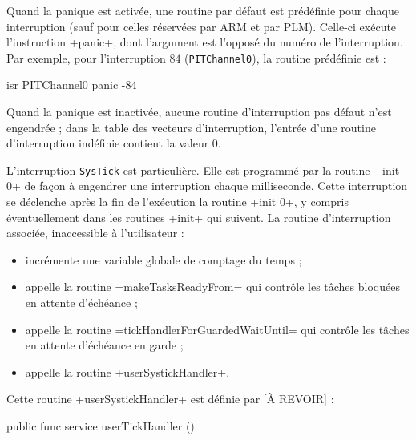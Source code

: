 Quand la panique est activée, une routine par défaut est prédéfinie pour chaque interruption (sauf pour celles réservées par ARM et par PLM). Celle-ci exécute l'instruction \plm+panic+, dont l'argument est l'opposé du numéro de l'interruption. Par exemple, pour l'interruption $84$ (\texttt{PITChannel0}), la routine prédéfinie est :

\begin{PLM}[1]
isr PITChannel0 {
  panic -84
}
\end{PLM}



Quand la panique est inactivée, aucune routine d'interruption pas défaut n'est engendrée ; dans la table des vecteurs d'interruption, l'entrée d'une routine d'interruption indéfinie contient la valeur $0$.






L'interruption \texttt{SysTick} est particulière. Elle est programmé par la routine \plm+init 0+ de façon à engendrer une interruption chaque milliseconde. Cette interruption se déclenche après la fin de l'exécution la routine \plm+init 0+, y compris éventuellement dans les routines \plm+init+ qui suivent. La routine d'interruption associée, inaccessible à l'utilisateur :
\begin{itemize}
  \item incrémente une variable globale de comptage du temps ;
  \item appelle la routine \plm=makeTasksReadyFrom= qui contrôle les tâches bloquées en attente d'échéance ; 
  \item appelle la routine \plm=tickHandlerForGuardedWaitUntil= qui contrôle les tâches en attente d'échéance en garde ; 
  \item appelle la routine \plm+userSystickHandler+.
\end{itemize}

Cette routine \plm+userSystickHandler+ est définie par [À REVOIR] :

\begin{PLM}[1]
public func service userTickHandler () {
}
\end{PLM}




